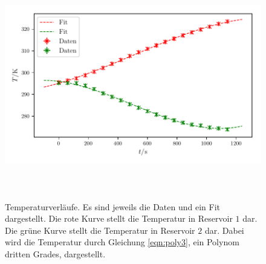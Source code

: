 \begin{figure} %
    \centering
    \includegraphics[width=14cm, height=10cm]{build/plot1.pdf}
    \caption{Temperaturverläufe. Es sind jeweils die Daten und ein Fit dargestellt.
    Die rote Kurve stellt die Temperatur in Reservoir $\num{1}$ dar. Die grüne Kurve stellt 
    die Temperatur in Reservoir $\num{2}$ dar. Dabei wird die Temperatur
durch Gleichung \ref{eqn:poly3}, ein Polynom dritten Grades, dargestellt.} 

    \label{fig:plot1}
\end{figure}


